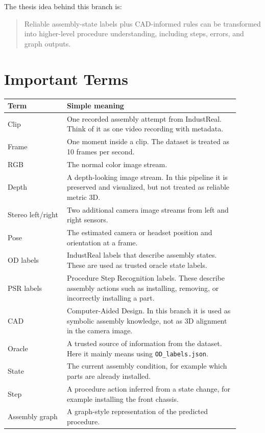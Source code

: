 \documentclass[11pt,a4paper]{article}
\begin{document}
The thesis idea behind this branch is:

\begin{quote}
Reliable assembly-state labels plus CAD-informed rules can be transformed into higher-level procedure understanding, including steps, errors, and graph outputs.
\end{quote}

\section{Important Terms}

\begin{longtable}{p{0.23\linewidth} p{0.67\linewidth}}
\toprule
\textbf{Term} & \textbf{Simple meaning} \\
\midrule
\endhead
Clip & One recorded assembly attempt from IndustReal. Think of it as one video recording with metadata. \\
Frame & One moment inside a clip. The dataset is treated as 10 frames per second. \\
RGB & The normal color image stream. \\
Depth & A depth-looking image stream. In this pipeline it is preserved and visualized, but not treated as reliable metric 3D. \\
Stereo left/right & Two additional camera image streams from left and right sensors. \\
Pose & The estimated camera or headset position and orientation at a frame. \\
OD labels & IndustReal labels that describe assembly states. These are used as trusted oracle state labels. \\
PSR labels & Procedure Step Recognition labels. These describe assembly actions such as installing, removing, or incorrectly installing a part. \\
CAD & Computer-Aided Design. In this branch it is used as symbolic assembly knowledge, not as 3D alignment in the camera image. \\
Oracle & A trusted source of information from the dataset. Here it mainly means using \texttt{OD\_labels.json}. \\
State & The current assembly condition, for example which parts are already installed. \\
Step & A procedure action inferred from a state change, for example installing the front chassis. \\
Assembly graph & A graph-style representation of the predicted procedure. \\
\bottomrule
\end{longtable}
\end{document}
